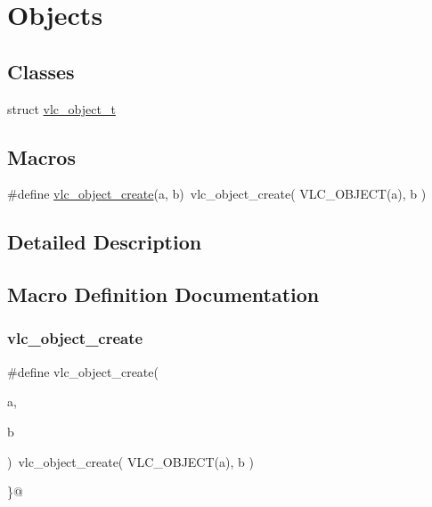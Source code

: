 \hypertarget{group__vlc__object}{}\section{Objects}
\label{group__vlc__object}
\subsection*{Classes}
\begin{DoxyCompactItemize}
\item 
struct \hyperlink{structvlc__object__t}{vlc\+\_\+object\+\_\+t}
\end{DoxyCompactItemize}
\subsection*{Macros}
\begin{DoxyCompactItemize}
\item 
\#define \hyperlink{group__vlc__object_ga0fc13b6591b055b566d1c4aaca5ff020}{vlc\+\_\+object\+\_\+create}(a,  b)~vlc\+\_\+object\+\_\+create( V\+L\+C\+\_\+\+O\+B\+J\+E\+CT(a), b )
\end{DoxyCompactItemize}


\subsection{Detailed Description}


\subsection{Macro Definition Documentation}
\mbox{\label{group__vlc__object_ga0fc13b6591b055b566d1c4aaca5ff020}} 
\subsubsection{\texorpdfstring{vlc\+\_\+object\+\_\+create}{vlc\_object\_create}}
{\footnotesize\ttfamily \#define vlc\+\_\+object\+\_\+create(\begin{DoxyParamCaption}\item[{}]{a,  }\item[{}]{b }\end{DoxyParamCaption})~vlc\+\_\+object\+\_\+create( V\+L\+C\+\_\+\+O\+B\+J\+E\+CT(a), b )}

\}@ 